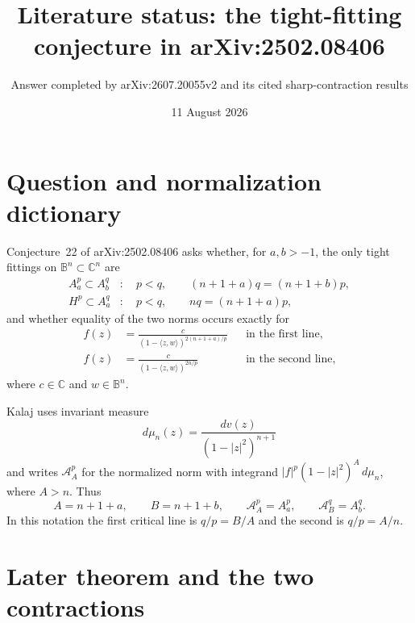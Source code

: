 \documentclass[11pt]{article}
\title{Literature status: the tight-fitting conjecture in arXiv:2502.08406}
\author{Answer completed by arXiv:2607.20055v2 and its cited sharp-contraction results}
\date{11 August 2026}
\newcommand{\B}{\mathbb B}
\newcommand{\C}{\mathbb C}
\begin{document}
\maketitle

\begin{center}
\end{center}

\section{Question and normalization dictionary}

Conjecture~22 of arXiv:2502.08406 asks whether, for $a,b>-1$, the only tight
fittings on $\B^n\subset\C^n$ are
\begin{align*}
 A_a^p\subset A_b^q &: \quad p<q,\qquad (n+1+a)q=(n+1+b)p, \\
 H^p\subset A_a^q &: \quad p<q,\qquad nq=(n+1+a)p,
\end{align*}
and whether equality of the two norms occurs exactly for
\begin{align*}
 f(z)&=\frac{c}{(1-\langle z,w\rangle)^{2(n+1+a)/p}}
 &&\text{in the first line},\\
 f(z)&=\frac{c}{(1-\langle z,w\rangle)^{2n/p}}
 &&\text{in the second line},
\end{align*}
where $c\in\C$ and $w\in\B^n$.

Kalaj uses invariant measure
\[
 d\mu_n(z)=\frac{dv(z)}{(1-|z|^2)^{n+1}}
\]
and writes $\mathcal A_A^p$ for the normalized norm with integrand
$|f|^p(1-|z|^2)^A\,d\mu_n$, where $A>n$.  Thus
\[
 A=n+1+a,\qquad B=n+1+b,\qquad
 \mathcal A_A^p=A_a^p,\qquad \mathcal A_B^q=A_b^q.
\]
In this notation the first critical line is $q/p=B/A$ and the second is
$q/p=A/n$.

\section{Later theorem and the two contractions}
\end{document}
